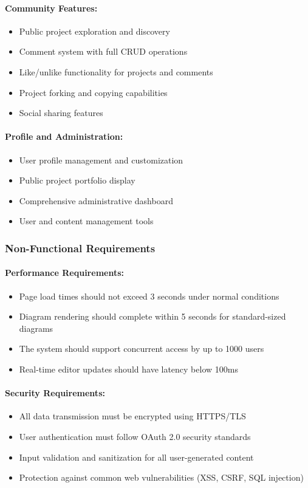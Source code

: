 \paragraph{Community Features:}
\begin{itemize}
    \item Public project exploration and discovery
    \item Comment system with full CRUD operations
    \item Like/unlike functionality for projects and comments
    \item Project forking and copying capabilities
    \item Social sharing features
\end{itemize}

\paragraph{Profile and Administration:}
\begin{itemize}
    \item User profile management and customization
    \item Public project portfolio display
    \item Comprehensive administrative dashboard
    \item User and content management tools
\end{itemize}

\subsubsection{Non-Functional Requirements}

\paragraph{Performance Requirements:}
\begin{itemize}
    \item Page load times should not exceed 3 seconds under normal conditions
    \item Diagram rendering should complete within 5 seconds for standard-sized diagrams
    \item The system should support concurrent access by up to 1000 users
    \item Real-time editor updates should have latency below 100ms
\end{itemize}

\paragraph{Security Requirements:}
\begin{itemize}
    \item All data transmission must be encrypted using HTTPS/TLS
    \item User authentication must follow OAuth 2.0 security standards
    \item Input validation and sanitization for all user-generated content
    \item Protection against common web vulnerabilities (XSS, CSRF, SQL injection)
\end{itemize}


